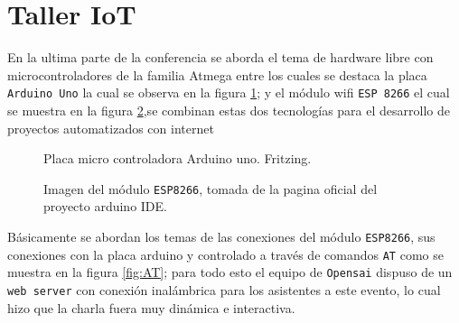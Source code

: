 \documentclass[jou]{apa6} %
\begin{document}
\section{Taller IoT}
En la ultima parte de la conferencia se aborda el tema de hardware libre con microcontroladores de la familia Atmega entre los cuales se destaca la placa \texttt{Arduino Uno} la cual se observa en la figura \ref{fig:Arduino}; y el módulo wifi \texttt{ESP 8266} el cual se muestra en la figura \ref{fig:ESP},se combinan estas dos tecnologías para el desarrollo de proyectos automatizados con internet
\\
\begin{figure}[htb]
  \centering
\setlength\fboxsep{0pt}
\setlength\fboxrule{0.5pt}
  \caption{\footnotesize Placa micro controladora Arduino uno. Fritzing.}
  \label{fig:Arduino}  
\end{figure}

\begin{figure}[htb]
  \centering
\setlength\fboxsep{0pt}
\setlength\fboxrule{0.5pt}
  \caption{\footnotesize Imagen  del módulo \texttt{ESP8266}, tomada de la pagina oficial del proyecto  arduino  IDE.}
  \label{fig:ESP}  
\end{figure}

Básicamente se abordan los temas  de las conexiones del módulo \texttt{ESP8266}, sus conexiones con la placa arduino y controlado a través de comandos \texttt{AT} como se muestra en la figura \ref{fig:AT}; para todo esto el equipo de \texttt{Opensai} dispuso de un \texttt{web server} con conexión inalámbrica para los asistentes a este evento, lo cual hizo que la charla fuera muy dinámica e interactiva.
\\
\end{document}
